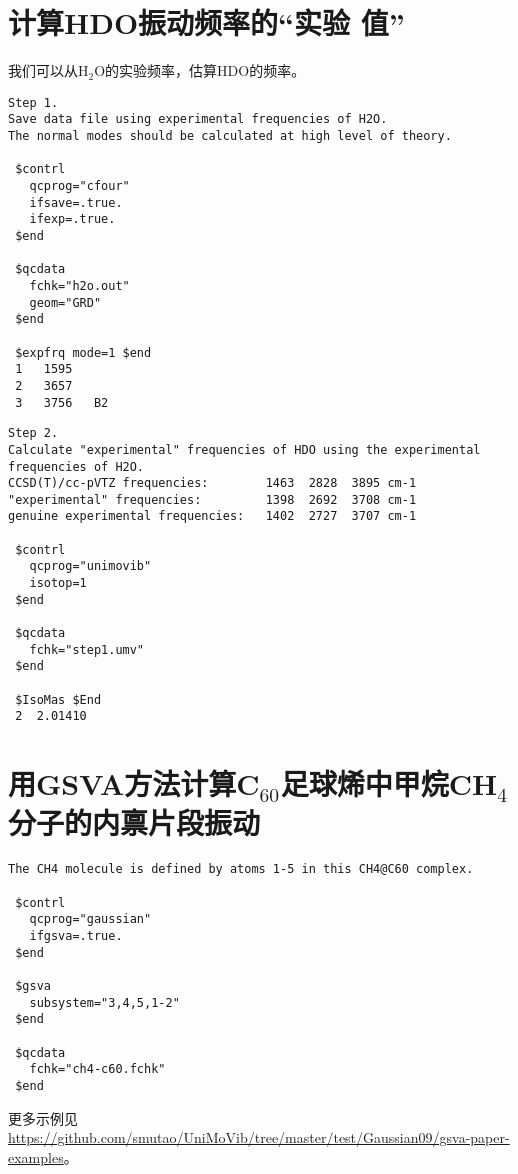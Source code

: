 \documentclass[12pt,a4paper,openany,twoside,cap,UTF8]{ctexbook}
\begin{document}
\section{计算HDO振动频率的``实验 值''} \label{sec:exp4}

我们可以从H$_2$O的实验频率，估算HDO的频率。

\begin{colorboxed}[oval=false,boxcolor=blue!75!black,bgcolor=blue!5!white]
\ttfamily\footnotesize
\begin{lstlisting}
Step 1.
Save data file using experimental frequencies of H2O.
The normal modes should be calculated at high level of theory.

 $contrl
   qcprog="cfour"
   ifsave=.true.
   ifexp=.true.
 $end

 $qcdata
   fchk="h2o.out"
   geom="GRD"
 $end

 $expfrq mode=1 $end
 1   1595
 2   3657
 3   3756   B2
\end{lstlisting}\end{colorboxed}

\begin{colorboxed}[oval=false,boxcolor=blue!75!black,bgcolor=blue!5!white]
\ttfamily\footnotesize
\begin{lstlisting}
Step 2.
Calculate "experimental" frequencies of HDO using the experimental frequencies of H2O.
CCSD(T)/cc-pVTZ frequencies:        1463  2828  3895 cm-1
"experimental" frequencies:         1398  2692  3708 cm-1
genuine experimental frequencies:   1402  2727  3707 cm-1

 $contrl
   qcprog="unimovib"
   isotop=1
 $end

 $qcdata
   fchk="step1.umv"
 $end

 $IsoMas $End
 2  2.01410
\end{lstlisting}\end{colorboxed}


\section{用GSVA方法计算C$_{60}$足球烯中甲烷CH$_4$分子的内禀片段振动 } \label{sec:gsva-example}

\begin{colorboxed}[oval=false,boxcolor=blue!75!black,bgcolor=blue!5!white]
\ttfamily\footnotesize
\begin{lstlisting}
The CH4 molecule is defined by atoms 1-5 in this CH4@C60 complex.

 $contrl
   qcprog="gaussian"
   ifgsva=.true.
 $end

 $gsva
   subsystem="3,4,5,1-2"
 $end

 $qcdata
   fchk="ch4-c60.fchk"
 $end
\end{lstlisting}\end{colorboxed}
更多示例见\href{https://github.com/smutao/UniMoVib/tree/master/test/Gaussian09/gsva-paper-examples}{https://github.com/smutao/UniMoVib/tree/master/test/Gaussian09/gsva-paper-examples}。
\end{document}
